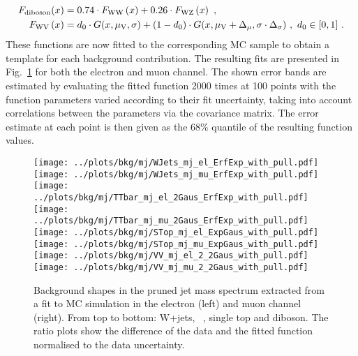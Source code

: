 \begin{align}
F_{\rm diboson}(x) &=  0.74 \cdot F_{\rm WW}\left(x\right) + 0.26 \cdot F_{\rm WZ}\left(x\right) ~,\\
F_{\rm WV}\left(x\right) &=  d_0 \cdot G(x,\mu_{\rm V},\sigma) + (1-d_0) \cdot G(x,\mu_{\rm V}+\Delta_\mu,\sigma\cdot\Delta_\sigma) ~ , ~ d_0 \in [0,1] ~ . 
\end{align}
These functions are now fitted to the corresponding MC sample to obtain a template for each background contribution. The resulting fits are presented in Fig.~\ref{fig:bkg:mjMC} for both the electron and muon channel. The shown error bands are estimated by evaluating the fitted function 2000 times at 100 points with the function parameters varied according to their fit uncertainty, taking into account correlations between the parameters via the covariance matrix. The error estimate at each point is then given as the 68\% quantile of the resulting function values.\\
\begin{figure}
	\centering
		\texttt{[image: ../plots/bkg/mj/WJets\_mj\_el\_ErfExp\_with\_pull.pdf]}
		\texttt{[image: ../plots/bkg/mj/WJets\_mj\_mu\_ErfExp\_with\_pull.pdf]}
		\texttt{[image: ../plots/bkg/mj/TTbar\_mj\_el\_2Gaus\_ErfExp\_with\_pull.pdf]}
		\texttt{[image: ../plots/bkg/mj/TTbar\_mj\_mu\_2Gaus\_ErfExp\_with\_pull.pdf]}
		\texttt{[image: ../plots/bkg/mj/STop\_mj\_el\_ExpGaus\_with\_pull.pdf]}
		\texttt{[image: ../plots/bkg/mj/STop\_mj\_mu\_ExpGaus\_with\_pull.pdf]}
		\texttt{[image: ../plots/bkg/mj/VV\_mj\_el\_2\_2Gaus\_with\_pull.pdf]}
		\texttt{[image: ../plots/bkg/mj/VV\_mj\_mu\_2\_2Gaus\_with\_pull.pdf]}
	\caption[Background shapes in the pruned jet mass spectrum]{Background shapes in the pruned jet mass spectrum extracted from a fit to MC simulation in the electron (left) and muon channel (right). From top to bottom: W+jets, \ttbar \ , single top and diboson. The ratio plots show the difference of the data and the fitted function normalised to the data uncertainty.}
	\label{fig:bkg:mjMC}
\end{figure}

